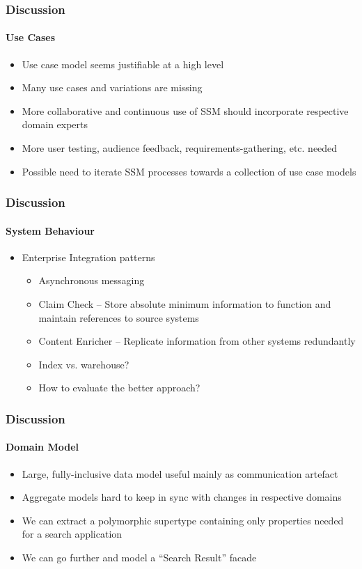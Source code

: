 \documentclass{beamer}
\begin{document}
\begin{frame}
  \frametitle{Discussion}
  \framesubtitle{Use Cases}
  \begin{itemize}
    \pause \item Use case model seems justifiable at a high level
    \pause \item Many use cases and variations are missing
    \pause \item More collaborative and continuous use of SSM should incorporate respective domain experts
    \pause \item More user testing, audience feedback, requirements-gathering, etc. needed
    \pause \item Possible need to iterate SSM processes towards a collection of use case models
  \end{itemize}
\end{frame}

\begin{frame}
  \frametitle{Discussion}
  \framesubtitle{System Behaviour}
  \begin{itemize}
    \pause \item Enterprise Integration patterns
    \begin{itemize}
      \pause \item Asynchronous messaging
      \pause \item Claim Check -- Store absolute minimum information to function and maintain references to source systems
      \pause \item Content Enricher -- Replicate information from other systems redundantly
      \pause \item Index vs. warehouse?
      \pause \item How to evaluate the better approach?
    \end{itemize}
  \end{itemize}
\end{frame}

\begin{frame}
  \frametitle{Discussion}
  \framesubtitle{Domain Model}
  \begin{itemize}
    \pause \item Large, fully-inclusive data model useful mainly as communication artefact
    \pause \item Aggregate models hard to keep in sync with changes in respective domains
    \pause \item We can extract a polymorphic supertype containing only properties needed for a search application
    \pause \item We can go further and model a ``Search Result'' facade
  \end{itemize}
\end{frame}
\end{document}
